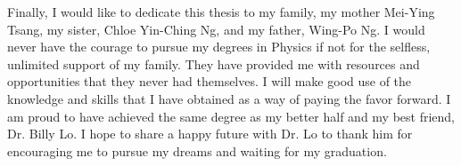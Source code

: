 Finally, I would like to dedicate this thesis to my family, my mother Mei-Ying
Tsang, my sister, Chloe Yin-Ching Ng, and my father, Wing-Po Ng.
I would never have the courage to pursue my degrees in Physics if not for the
selfless, unlimited support of my family.  
They have provided me with resources and opportunities that they never had
themselves. 
I will make good use of the knowledge and skills that I have obtained as a way
of paying the favor forward. I am proud to have achieved the same degree as my 
better half and my best friend, Dr. Billy Lo. I hope to share a happy future
with Dr. Lo to thank him for encouraging me to pursue my dreams and waiting for
my graduation. 
